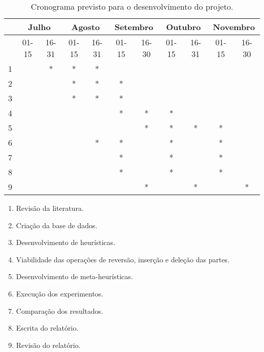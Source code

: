 \documentclass[a4paper, 11pt]{article}
\begin{document}
        \begin{table}[H]
            \centering
            \begin{tabular}{|c||c|c|c|c|c|c|c|c|c|c|}
                \hline
                 & \multicolumn{2}{c|}{Julho} & \multicolumn{2}{c|}{Agosto} & \multicolumn{2}{c|}{Setembro} & \multicolumn{2}{c|}{Outubro} & \multicolumn{2}{c|}{Novembro} \\
                \hline
                 & 01-15 & 16-31 & 01-15 & 16-31 & 01-15 & 16-30 & 01-15 & 16-31 & 01-15 & 16-30 \\
                \hline\hline
                1 & &*&*&*& & & & & & \\
                \hline
                2 & & &*&*&*& & & & & \\
                \hline
                3 & & &*&*&*& & & & & \\
                \hline
                4 & & & & &*&*&*& & & \\
                \hline
                5 & & & & & &*&*&*&*& \\
                \hline
                6 & & & &*&*& &*& &*& \\
                \hline
                7 & & & & &*& &*& &*& \\
                \hline
                8 & & & & &*& &*& &*& \\
                \hline
                9 & & & & & &*& &*& &*\\
                \hline
            \end{tabular}
            \caption{Cronograma previsto para o desenvolvimento do projeto.}
            \label{tab:cronograma}
        \end{table}

        \begin{enumerate}[itemsep=0pt]
            \item Revisão da literatura.
            \item Criação da base de dados.
            \item Desenvolvimento de heurísticas.
            \item Viabilidade das operações de reversão, inserção e deleção das partes.
            \item Desenvolvimento de meta-heurísticas.
            \item Execução dos experimentos.
            \item Comparação dos resultados.
            \item Escrita do relatório.
            \item Revisão do relatório.
        \end{enumerate}
\end{document}
